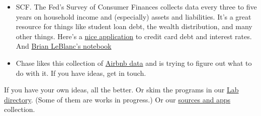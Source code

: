 \documentclass[11pt]{article}
\begin{document}
\begin{itemize}
\begin{itemize}
\item SCF.  The Fed's Survey of Consumer Finances collects data every three to five years
on household income and (especially) assets and liabilities.  
It's a great resource for things like student loan debt, the wealth distribution, 
and many other things.  
Here's a 
\href{http://www.npr.org/sections/money/2015/08/14/431263285/13-years-of-american-credit-cards-in-one-graph}
{nice application}
to credit card debt and interest rates.
And 
\href{https://github.com/DaveBackus/Data_Bootcamp/blob/master/Code/Lab/SCF_data_experiment_Brian.ipynb}
{Brian LeBlanc's notebook}


\item Chase likes this collection of \href{http://insideairbnb.com/index.html}{Airbnb data}
and is trying to figure out what to do with it.  If you have ideas, get in touch.  
\end{itemize} 

If you have your own ideas, all the better.  Or skim the programs in our 
\href{https://github.com/DaveBackus/Data_Bootcamp/tree/master/Code/Lab}{Lab directory}.  
(Some of them are works in progress.)  
Or our 
\href{https://docs.google.com/document/d/1L2ZDKFyyqfOrCGbNcCIE9mmgap4tjkTNuw32hK4c6BI/edit?usp=sharing}
{sources and apps} collection.  


\begin{comment} 
\item {\bf IPython notebook of data input chapter.\/}
Create a notebook that goes through the material of the data input chapter of the book,
or perhaps one of the other early chapters.
The result should be a notebook that allows others to teach themselves.
Include blank cells for exercises.
\end{comment} 
\end{itemize}



\end{document}
